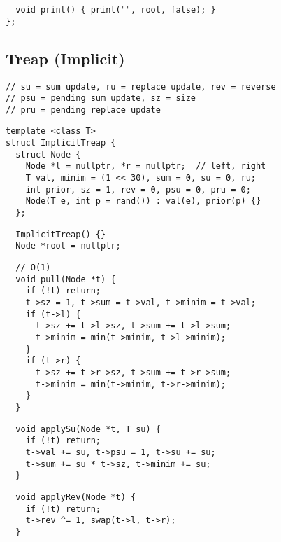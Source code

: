 \documentclass[twoside]{article}
\begin{document}
\begin{multicols*}{2}
\begin{verbatim}
  void print() { print("", root, false); }
};
\end{verbatim}

\subsectionfont{\large\bfseries\sffamily\underline}
\subsection*{Treap (Implicit)}
\begin{verbatim}
// su = sum update, ru = replace update, rev = reverse
// psu = pending sum update, sz = size
// pru = pending replace update
\end{verbatim}
\vspace{-12pt}
\begin{verbatim}
template <class T>
struct ImplicitTreap {
  struct Node {
    Node *l = nullptr, *r = nullptr;  // left, right
    T val, minim = (1 << 30), sum = 0, su = 0, ru;
    int prior, sz = 1, rev = 0, psu = 0, pru = 0;
    Node(T e, int p = rand()) : val(e), prior(p) {}
  };
\end{verbatim}
\vspace{-12pt}
\begin{verbatim}
  ImplicitTreap() {}
  Node *root = nullptr;
\end{verbatim}
\vspace{-12pt}
\begin{verbatim}
  // O(1)
  void pull(Node *t) {
    if (!t) return;
    t->sz = 1, t->sum = t->val, t->minim = t->val;
    if (t->l) {
      t->sz += t->l->sz, t->sum += t->l->sum;
      t->minim = min(t->minim, t->l->minim);
    }
    if (t->r) {
      t->sz += t->r->sz, t->sum += t->r->sum;
      t->minim = min(t->minim, t->r->minim);
    }
  }
\end{verbatim}
\vspace{-12pt}
\begin{verbatim}
  void applySu(Node *t, T su) {
    if (!t) return;
    t->val += su, t->psu = 1, t->su += su;
    t->sum += su * t->sz, t->minim += su;
  }
\end{verbatim}
\vspace{-12pt}
\begin{verbatim}
  void applyRev(Node *t) {
    if (!t) return;
    t->rev ^= 1, swap(t->l, t->r);
  }
\end{verbatim}
\vspace{-12pt}

\end{multicols*}
\end{document}
